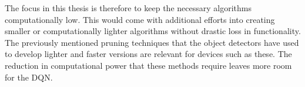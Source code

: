 The focus in this thesis is therefore to keep the necessary algorithms  
computationally low. This would come with additional 
efforts into creating smaller or computationally lighter algorithms without
drastic loss in functionality. The previously mentioned pruning techniques that 
the object detectors have used to develop lighter and faster versions are relevant 
for devices such as these. The reduction in computational power that these methods 
require leaves more room for the DQN. 
